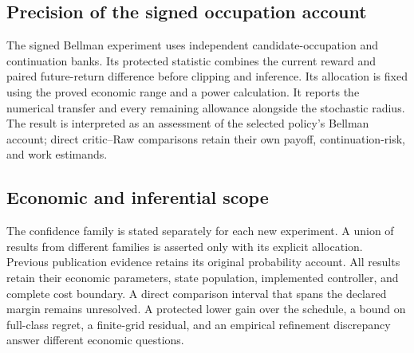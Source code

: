 \subsection{Precision of the signed occupation account}
\label{sec:r16mechanismdesign}
The signed Bellman experiment uses independent candidate-occupation and continuation banks. Its protected statistic combines the current reward and paired future-return difference before clipping and inference. Its allocation is fixed using the proved economic range and a power calculation. It reports the numerical transfer and every remaining allowance alongside the stochastic radius. The result is interpreted as an assessment of the selected policy's Bellman account; direct critic--Raw comparisons retain their own payoff, continuation-risk, and work estimands.

\subsection{Economic and inferential scope}
The confidence family is stated separately for each new experiment. A union of results from different families is asserted only with its explicit allocation. Previous publication evidence retains its original probability account. All results retain their economic parameters, state population, implemented controller, and complete cost boundary. A direct comparison interval that spans the declared margin remains unresolved. A protected lower gain over the schedule, a bound on full-class regret, a finite-grid residual, and an empirical refinement discrepancy answer different economic questions.
